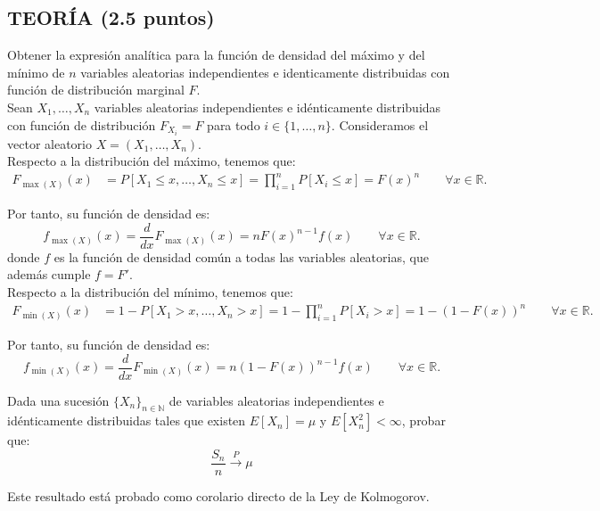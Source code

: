 \documentclass[12pt]{article}
\begin{document}
    \subsection*{TEORÍA (2.5 puntos)}
    \begin{ejercicio}
        Obtener la expresión analítica para la función de densidad del máximo y del mínimo de $n$ variables aleatorias independientes e identicamente distribuidas con función de distribución marginal $F$.\\

        Sean $X_1,\dots,X_n$ variables aleatorias independientes e idénticamente distribuidas con función de distribución $F_{X_i}=F$ para todo $i\in \{1,\dots,n\}$. Consideramos el vector aleatorio $X=(X_1,\dots,X_n)$.\\

        Respecto a la distribución del máximo, tenemos que:
        \begin{align*}
            F_{\max(X)}(x) &= P[X_1\leq x,\dots,X_n\leq x] = \prod_{i=1}^n P[X_i\leq x] = F(x)^n\qquad \forall x\in \mathbb{R}.
        \end{align*}

        Por tanto, su función de densidad es:
        \begin{equation*}
            f_{\max(X)}(x) = \frac{d}{dx}F_{\max(X)}(x) = nF(x)^{n-1}f(x)\qquad \forall x\in \mathbb{R}.
        \end{equation*}
        donde $f$ es la función de densidad común a todas las variables aleatorias, que además cumple $f=F'$.\\

        Respecto a la distribución del mínimo, tenemos que:
        \begin{align*}
            F_{\min(X)}(x) &= 1-P[X_1>x,\dots,X_n>x] = 1-\prod_{i=1}^n P[X_i>x] = 1-(1-F(x))^n\qquad \forall x\in \mathbb{R}.
        \end{align*}

        Por tanto, su función de densidad es:
        \begin{equation*}
            f_{\min(X)}(x) = \frac{d}{dx}F_{\min(X)}(x) = n(1-F(x))^{n-1}f(x)\qquad \forall x\in \mathbb{R}.
        \end{equation*}

    \end{ejercicio}

    \begin{ejercicio}
        Dada una sucesión $\{X_n\}_{n\in \mathbb{N}}$ de variables aleatorias independientes e idénticamente distribuidas tales que existen $E[X_n] = \mu$ y $E[X_n^2] < \infty$, probar que:
        $$\frac{S_n}{n}\stackrel{P}{\rightarrow} \mu$$

        Este resultado está probado como corolario directo de la Ley de Kolmogorov.
    \end{ejercicio}
\end{document}
